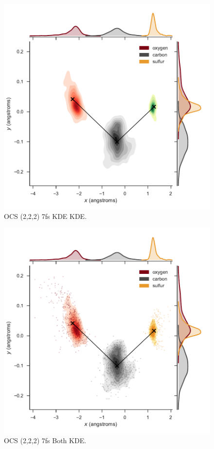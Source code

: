 \pagebreak
\begin{figure}
  \centering
  \includegraphics[width=\textwidth]{Plots/OCS2227fsKdeKde}
  \caption[OCS (2,2,2) 7fs KDE KDE.]
  {OCS (2,2,2) 7fs KDE KDE.}
  \label{fig:OCS2227fsKdeKde}
\end{figure}
\clearpage

\pagebreak
\begin{figure}
  \centering
  \includegraphics[width=\textwidth]{Plots/OCS2227fsBothKde}
  \caption[OCS (2,2,2) 7fs Both KDE.]
  {OCS (2,2,2) 7fs Both KDE.}
  \label{fig:OCS2227fsBothKde}
\end{figure}
\clearpage

